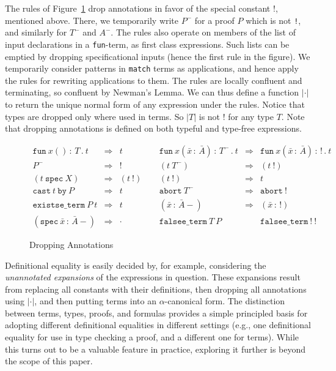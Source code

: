 \documentclass{fundam}
\newcommand{\bang}[0]{\texttt{!}}
\newcommand{\To}{\Rightarrow}
\begin{document}
\noindent The rules of Figure~\ref{fig:dropannos} drop annotations in
favor of the special constant $\bang$, mentioned above.  There, we
temporarily write $P^-$ for a proof $P$ which is not \bang, and
similarly for $T^-$ and $A^-$.  The rules also operate on members of
the list of input declarations in a \texttt{fun}-term, as first class
expressions.  Such lists can be emptied by dropping specificational
inputs (hence the first rule in the figure).  We temporarily consider
patterns in \texttt{match} terms as applications, and hence apply the
rules for rewriting applications to them.  The rules are locally
confluent and terminating, so confluent by Newman's Lemma.  We can
thus define a function $|\cdot|$ to return the unique normal form of
any expression under the rules.  Notice that types are dropped only
where used in terms.  So $|T|$ is not $\bang$ for any type $T$.  Note
that dropping annotations is defined on both typeful and type-free
expressions.

\begin{figure}
\[
\begin{array}{lllllll} 
\texttt{fun}\ x()\, :\, T\, .\ t & \To & t & \ \ & 
\texttt{fun}\ x(\bar{x}\,:\,\bar{A})\, :\, T^-\, .\ t & \To &
\texttt{fun}\ x(\bar{x}\,:\,\bar{A})\, :\, \bang\, .\ t \\
P^- & \To & \bang &\ \ & 
(t\ T^-) & \To & (t\ \bang) \\
(t\ \texttt{spec}\ X) & \To & (t\ \bang) &\ \ &
(t\ \bang) & \To & t \\
\texttt{cast}\ t\ \texttt{by}\ P & \To & t &\ \  &
\texttt{abort}\ T^- & \To & \texttt{abort}\ \bang \\
\texttt{existse\_term}\ P\ t & \To & t &\ \ &
(\bar{x}\,:\,\bar{A}-) & \To & (\bar{x}\,:\,\bang) \\
(\texttt{spec}\ \bar{x}\,:\,\bar{A}-) & \To & \cdot &\ & 
\texttt{falsee\_term}\ T\ P & \ & \texttt{falsee\_term}\ \bang\ \bang
\end{array}
\]
\caption{\label{fig:dropannos}Dropping Annotations}
\end{figure}

Definitional equality is easily decided by, for example, considering
the \emph{unannotated expansions} of the expressions in question.
These expansions result from replacing all constants with their
definitions, then dropping all annotations using $|\cdot|$, and then
putting terms into an $\alpha$-canonical form.  The distinction
between terms, types, proofs, and formulas provides a simple
principled basis for adopting different definitional equalities in
different settings (e.g., one definitional equality for use in type
checking a proof, and a different one for terms).  While this turns
out to be a valuable feature in practice, exploring it further is
beyond the scope of this paper.
\end{document}
